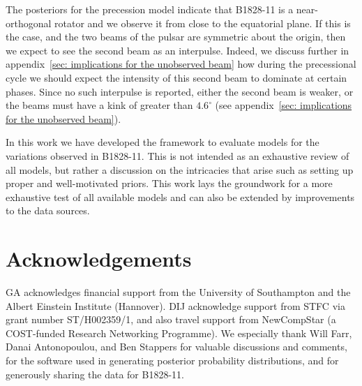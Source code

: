 \documentclass[../full_thesis/full_thesis.tex]{subfiles}
\newcommand{\degr}{^{\circ}}
\begin{document}
The posteriors for the precession model indicate that B1828-11 is a
near-orthogonal rotator and we observe it from close to the equatorial plane.
If this is the case, and the two beams of the pulsar are symmetric about the
origin, then we expect to see the second beam as an interpulse. Indeed, we
discuss further in appendix~\ref{sec: implications for the unobserved beam} how
during the precessional cycle we should expect the intensity of this second
beam to dominate at certain phases. Since no such interpulse is reported,
either the second beam is weaker, or the beams must have a kink of greater than
$4.6\degr$ (see appendix~\ref{sec: implications for the unobserved beam}).

In this work we have developed the framework to evaluate models for the
variations observed in B1828-11. This is not intended as an exhaustive review
of all models, but rather a discussion on the intricacies that arise such as
setting up proper and well-motivated priors. This work lays the groundwork
for a more exhaustive test of all available models and can also be extended
by improvements to the data sources.

\section*{Acknowledgements}
GA acknowledges financial support from the University of Southampton and the
Albert Einstein Institute (Hannover).  DIJ acknowledge support from STFC via
grant number ST/H002359/1, and also travel support from NewCompStar (a
COST-funded Research Networking Programme).  We especially thank Will Farr,
Danai Antonopoulou, and Ben Stappers for valuable discussions and comments,
\citet{dan_foreman_mackey_2014_11020} for the software used in generating
posterior probability distributions, and \citet{Lyne2010} for generously sharing
the data for B1828-11.

\biblio
\end{document}
